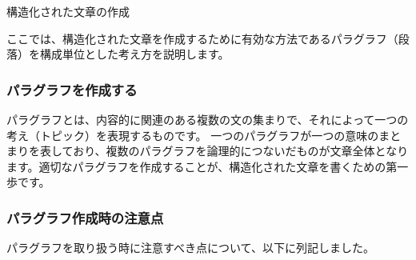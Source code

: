 \documentclass[12pt,a4paper]{jsarticle}
\makeatletter
\def\subsection{\@startsection 
{subsection}
{1}
{\z@}
{3.5ex plus -1ex minus -.2ex}
{1.ex plus .2ex}
{\large\bf}
}
\makeatother
\begin{document}
\subsection{構造化された文章の作成}

ここでは、構造化された文章を作成するために有効な方法であるパラグラフ（段落）を構成単位とした考え方を説明します。

\subsubsection{パラグラフを作成する}

パラグラフとは、内容的に関連のある複数の文の集まりで、それによって一つの考え（トピック）を表現するものです。
一つのパラグラフが一つの意味のまとまりを表しており、複数のパラグラフを論理的につないだものが文章全体となります。適切なパラグラフを作成することが、構造化された文章を書くための第一歩です。

\subsubsection{パラグラフ作成時の注意点}

パラグラフを取り扱う時に注意すべき点について、以下に列記しました。
\end{document}

